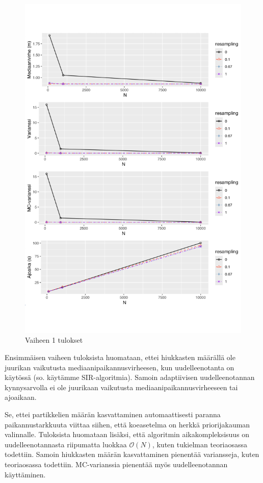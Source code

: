 \documentclass[
  12pt,
  a4paper, twoside]{book}
\begin{document}
\begin{figure}[H]
\centering
\includegraphics[width=15cm]{phase1_results_vertical_safe}
\caption{Vaiheen 1 tulokset}
\label{fig:phase1_results}
\end{figure}

Ensimmäisen vaiheen tuloksista huomataan, ettei hiukkasten määrällä ole juurikan vaikutusta mediaanipaikannusvirheesen, kun uudelleenotanta on käytössä (so. käytämme SIR-algoritmia). Samoin adaptiivisen uudelleenotannan kynnysarvolla ei ole juurikaan vaikutusta mediaanipaikannusvirheeseen tai ajoaikaan.

Se, ettei partikkelien määrän kasvattaminen automaattisesti paranna paikannustarkkuuta viittaa siihen, että koeasetelma on herkkä priorijakauman valinnalle. Tuloksista huomataan lisäksi, että algoritmin aikakompleksisuus on uudelleenotannasta riipumatta luokkaa \(\mathcal{O}(N)\), kuten tukielman teoriaosassa todettiin. Samoin hiukkasten määrän kasvattaminen pienentää variansseja, kuten teoriaosassa todettiin. MC-varianssia pienentää myös uudelleenotannan käyttäminen.
\end{document}
